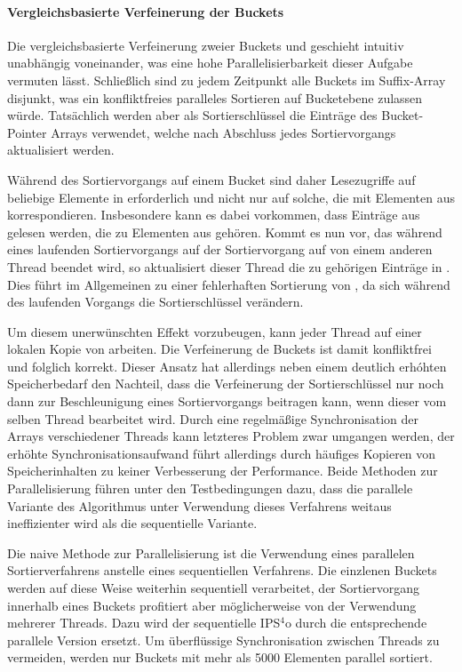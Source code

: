 \paragraph{Vergleichsbasierte Verfeinerung der Buckets}
Die vergleichsbasierte Verfeinerung zweier Buckets  und  geschieht intuitiv unabhängig voneinander, was eine hohe Parallelisierbarkeit dieser Aufgabe vermuten lässt.
Schließlich sind zu jedem Zeitpunkt alle Buckets im Suffix-Array disjunkt, was ein konfliktfreies paralleles Sortieren auf Bucketebene zulassen würde.
Tatsächlich werden aber als Sortierschlüssel die Einträge des Bucket-Pointer Arrays \bptr verwendet, welche nach Abschluss jedes Sortiervorgangs aktualisiert werden.\par
Während des Sortiervorgangs auf einem Bucket  sind daher Lesezugriffe auf beliebige Elemente in \bptr erforderlich und nicht nur auf solche, die mit Elementen aus  korrespondieren.
Insbesondere kann es dabei vorkommen, dass Einträge aus \bptr gelesen werden, die zu Elementen aus  gehören.
Kommt es nun vor, das während eines laufenden Sortiervorgangs auf  der Sortiervorgang auf  von einem anderen Thread beendet wird, so aktualisiert dieser Thread die zu  gehörigen Einträge in \bptr.
Dies führt im Allgemeinen zu einer fehlerhaften Sortierung von , da sich während des laufenden Vorgangs die Sortierschlüssel verändern.\par\smallskip
Um diesem unerwünschten Effekt vorzubeugen, kann jeder Thread auf einer lokalen Kopie von \bptr arbeiten.
Die Verfeinerung de Buckets ist damit konfliktfrei und folglich korrekt.
Dieser Ansatz hat allerdings neben einem deutlich erhóhten Speicherbedarf den Nachteil, dass die Verfeinerung der Sortierschlüssel nur noch dann zur Beschleunigung eines Sortiervorgangs beitragen kann, wenn dieser vom selben Thread bearbeitet wird.
Durch eine regelmäßige Synchronisation der \bptr Arrays verschiedener Threads kann letzteres Problem zwar umgangen werden, der erhöhte Synchronisationsaufwand führt allerdings durch häufiges Kopieren von Speicherinhalten zu keiner Verbesserung der Performance.
Beide Methoden zur Parallelisierung führen unter den Testbedingungen dazu, dass die parallele Variante des Algorithmus unter Verwendung dieses Verfahrens weitaus ineffizienter wird als die sequentielle Variante.\par\smallskip
Die naive Methode zur Parallelisierung ist die Verwendung eines parallelen Sortierverfahrens anstelle eines sequentiellen Verfahrens.
Die einzlenen Buckets werden auf diese Weise weiterhin sequentiell verarbeitet, der Sortiervorgang innerhalb eines Buckets profitiert aber möglicherweise von der Verwendung mehrerer Threads. Dazu wird der sequentielle IPS\(^4\)o \cite{axtmann2017} durch die entsprechende parallele Version ersetzt.
Um überflüssige Synchronisation zwischen Threads zu vermeiden, werden nur Buckets mit mehr als 5000 Elementen parallel sortiert.

